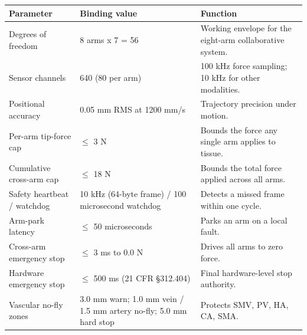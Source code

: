 \noindent\begin{tabularx}{\textwidth}{L{4.4cm} L{5.6cm} Y}
\toprule
\textbf{Parameter} & \textbf{Binding value} & \textbf{Function} \\
\midrule
Degrees of freedom & 8 arms x 7 = 56 & Working envelope for the eight-arm collaborative system. \\
\addlinespace
Sensor channels & 640 (80 per arm) & 100 kHz force sampling; 10 kHz for other modalities. \\
\addlinespace
Positional accuracy & 0.05 mm RMS at 1200 mm/s & Trajectory precision under motion. \\
\addlinespace
Per-arm tip-force cap & $\leq$ 3 N & Bounds the force any single arm applies to tissue. \\
\addlinespace
Cumulative cross-arm cap & $\leq$ 18 N & Bounds the total force applied across all arms. \\
\addlinespace
Safety heartbeat / watchdog & 10 kHz (64-byte frame) / 100 microsecond watchdog & Detects a missed frame within one cycle. \\
\addlinespace
Arm-park latency & $\leq$ 50 microseconds & Parks an arm on a local fault. \\
\addlinespace
Cross-arm emergency stop & $\leq$ 3 ms to 0.0 N & Drives all arms to zero force. \\
\addlinespace
Hardware emergency stop & $\leq$ 500 ms (21 CFR \S 312.404) & Final hardware-level stop authority. \\
\addlinespace
Vascular no-fly zones & 3.0 mm warn; 1.0 mm vein / 1.5 mm artery no-fly; 5.0 mm hard stop & Protects SMV, PV, HA, CA, SMA. \\
\bottomrule
\end{tabularx}
\vspace*{-0.35cm}

